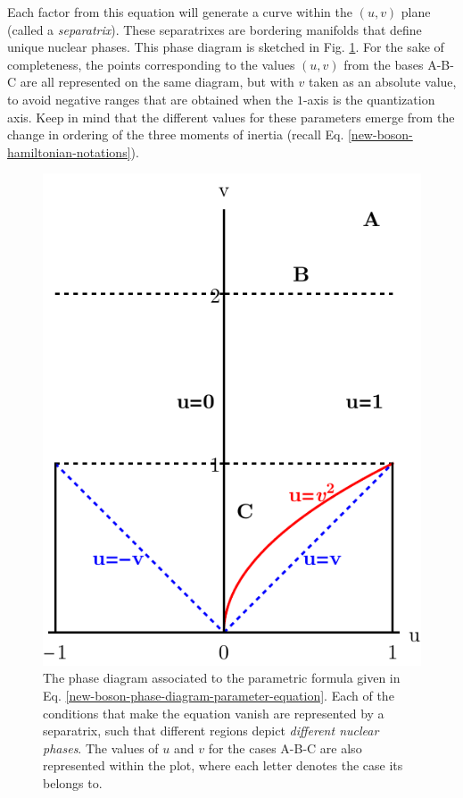 Each factor from this equation will generate a curve within the $(u,v)$ plane (called a \emph{separatrix}). These separatrixes are bordering manifolds that define unique nuclear phases. This phase diagram is sketched in Fig. \ref{separatrix-diagram}. For the sake of completeness, the points corresponding to the values $(u,v)$ from the bases A-B-C are all represented on the same diagram, but with $v$ taken as an absolute value, to avoid negative ranges that are obtained when the $1$-axis is the quantization axis. Keep in mind that the different values for these parameters emerge from the change in ordering of the three moments of inertia (recall Eq. \ref{new-boson-hamiltonian-notations}).
\begin{figure}
    \centering
    \includegraphics[scale=0.85]{Chapters/Figures/new-boson-separatrix-diagram.pdf}
    \caption{The phase diagram associated to the parametric formula given in Eq. \ref{new-boson-phase-diagram-parameter-equation}. Each of the conditions that make the equation vanish are represented by a separatrix, such that different regions depict \emph{different nuclear phases}. The values of $u$ and $v$ for the cases A-B-C are also represented within the plot, where each letter denotes the case its belongs to.}
    \label{separatrix-diagram}
\end{figure}

